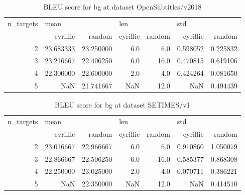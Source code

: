 \begin{table}[h]
\begin{tabular}{rrrrrrr}
\toprule
n\_targets & \multicolumn{2}{l}{mean} & \multicolumn{2}{l}{len} & \multicolumn{2}{l}{std} \\
          &   cyrillic &     random & cyrillic & random &  cyrillic &    random \\
\midrule
        2 &  23.683333 &  23.250000 &      6.0 &    6.0 &  0.598052 &  0.225832 \\
        3 &  23.216667 &  22.406250 &      6.0 &   16.0 &  0.470815 &  0.619106 \\
        4 &  22.300000 &  22.600000 &      2.0 &    4.0 &  0.424264 &  0.081650 \\
        5 &        NaN &  21.741667 &      NaN &   12.0 &       NaN &  0.494439 \\
\bottomrule
\end{tabular}

\caption{BLEU score for  bg at dataset OpenSubtitles/v2018 }
\label{ table:bg/OpenSubtitles/v2018 }
\end{table}

\begin{table}[h]
\begin{tabular}{rrrrrrr}
\toprule
n\_targets & \multicolumn{2}{l}{mean} & \multicolumn{2}{l}{len} & \multicolumn{2}{l}{std} \\
          &   cyrillic &     random & cyrillic & random &  cyrillic &    random \\
\midrule
        2 &  23.016667 &  22.966667 &      6.0 &    6.0 &  0.910860 &  1.050079 \\
        3 &  22.866667 &  22.506250 &      6.0 &   16.0 &  0.585377 &  0.868308 \\
        4 &  22.250000 &  23.025000 &      2.0 &    4.0 &  0.070711 &  0.386221 \\
        5 &        NaN &  22.350000 &      NaN &   12.0 &       NaN &  0.414510 \\
\bottomrule
\end{tabular}

\caption{BLEU score for  bg at dataset SETIMES/v1 }
\label{ table:bg/SETIMES/v1 }
\end{table}

